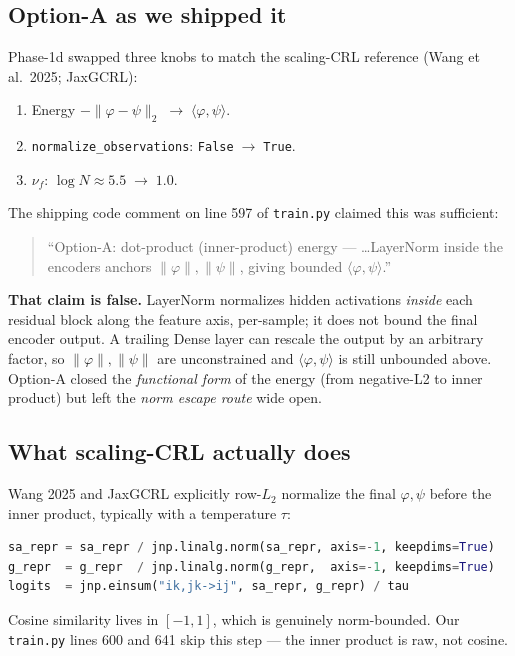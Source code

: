 \documentclass[11pt]{article}
\begin{document}
\subsection*{Option-A as we shipped it}

Phase-1d swapped three knobs to match the scaling-CRL reference
(Wang et al.\ 2025; JaxGCRL):
\begin{enumerate}[leftmargin=1.6em,itemsep=1pt,topsep=1pt]
\item Energy $-\|\varphi-\psi\|_2\;\to\;\langle\varphi,\psi\rangle$.
\item \texttt{normalize\_observations}: \texttt{False}$\;\to\;$\texttt{True}.
\item $\nu_f$: $\log N\approx 5.5\;\to\;1.0$.
\end{enumerate}
The shipping code comment on line 597 of \texttt{train.py} claimed this
was sufficient:
\begin{quote}
\small ``Option-A: dot-product (inner-product) energy --- \ldots LayerNorm
inside the encoders anchors $\|\varphi\|,\|\psi\|$, giving bounded
$\langle\varphi,\psi\rangle$.''
\end{quote}
\textbf{That claim is false.} LayerNorm normalizes hidden activations
\emph{inside} each residual block along the feature axis, per-sample; it
does not bound the final encoder output. A trailing Dense layer can
rescale the output by an arbitrary factor, so $\|\varphi\|,\|\psi\|$ are
unconstrained and $\langle\varphi,\psi\rangle$ is still unbounded above.
Option-A closed the \emph{functional form} of the energy (from negative-L2
to inner product) but left the \emph{norm escape route} wide open.

\subsection*{What scaling-CRL actually does}

Wang 2025 and JaxGCRL explicitly row-$L_2$ normalize the final $\varphi,\psi$
before the inner product, typically with a temperature $\tau$:

\begin{lstlisting}[language=Python]
sa_repr = sa_repr / jnp.linalg.norm(sa_repr, axis=-1, keepdims=True)
g_repr  = g_repr  / jnp.linalg.norm(g_repr,  axis=-1, keepdims=True)
logits  = jnp.einsum("ik,jk->ij", sa_repr, g_repr) / tau
\end{lstlisting}

\noindent
Cosine similarity lives in $[-1,1]$, which is genuinely norm-bounded. Our
\texttt{train.py} lines 600 and 641 skip this step --- the inner product is
raw, not cosine.
\end{document}
